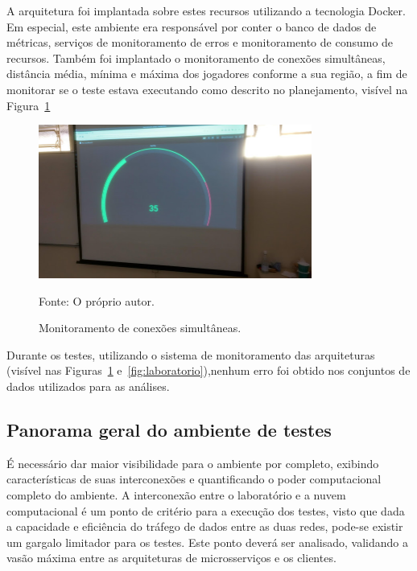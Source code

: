 A arquitetura foi implantada sobre estes recursos utilizando a tecnologia Docker. Em especial, este ambiente era responsável por conter o banco de dados de métricas, serviços de monitoramento de erros e monitoramento de consumo de recursos.
%
Também foi implantado o monitoramento de conexões simultâneas, distância média, mínima e máxima dos jogadores conforme a sua região, a fim de monitorar se o teste estava executando como descrito no planejamento, visível na Figura~\ref{fig:lab_monitor}

\begin{figure}[htb!]
  \caption{Monitoramento de conexões simultâneas.}
  \label{fig:lab_monitor}
  \includegraphics[width=0.8\textwidth]{figuras/network/metrics.jpg}
  \centering

  Fonte: O próprio autor.
\end{figure}

Durante os testes, utilizando o sistema de monitoramento das arquiteturas (visível nas Figuras~\ref{fig:lab_monitor} e~\ref{fig:laboratorio}),nenhum erro foi obtido nos conjuntos de dados utilizados para as análises.

\subsection{Panorama geral do ambiente de testes}
\label{sec:nuvem_lab}

É necessário dar maior visibilidade para o ambiente por completo, exibindo características de suas interconexões e quantificando o poder computacional completo do ambiente.
%
A interconexão entre o laboratório e a nuvem computacional é um ponto de critério para a execução dos testes, visto que dada a capacidade e eficiência do tráfego de dados entre as duas redes, pode-se existir um gargalo limitador para os testes.
%
Este ponto deverá ser analisado, validando a vasão máxima entre as arquiteturas de microsserviços e os clientes.
